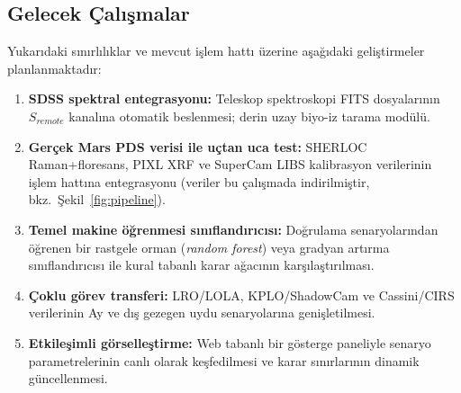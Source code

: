 \documentclass[12pt,a4paper]{article}
\begin{document}
\subsection{Gelecek Çalışmalar}
Yukarıdaki sınırlılıklar ve mevcut işlem hattı üzerine aşağıdaki geliştirmeler planlanmaktadır:
\begin{enumerate}
    \item \textbf{SDSS spektral entegrasyonu:} Teleskop spektroskopi FITS dosyalarının $S_{remote}$ kanalına otomatik beslenmesi; derin uzay biyo-iz tarama modülü.
    \item \textbf{Gerçek Mars PDS verisi ile uçtan uca test:} SHERLOC Raman+floresans, PIXL XRF ve SuperCam LIBS kalibrasyon verilerinin işlem hattına entegrasyonu (veriler bu çalışmada indirilmiştir, bkz.\ Şekil~\ref{fig:pipeline}).
    \item \textbf{Temel makine öğrenmesi sınıflandırıcısı:} Doğrulama senaryolarından öğrenen bir rastgele orman (\textit{random forest}) veya gradyan artırma sınıflandırıcısı ile kural tabanlı karar ağacının karşılaştırılması.
    \item \textbf{Çoklu görev transferi:} LRO/LOLA, KPLO/ShadowCam ve Cassini/CIRS verilerinin Ay ve dış gezegen uydu senaryolarına genişletilmesi.
    \item \textbf{Etkileşimli görselleştirme:} Web tabanlı bir gösterge paneliyle senaryo parametrelerinin canlı olarak keşfedilmesi ve karar sınırlarının dinamik güncellenmesi.
\end{enumerate}
\end{document}
